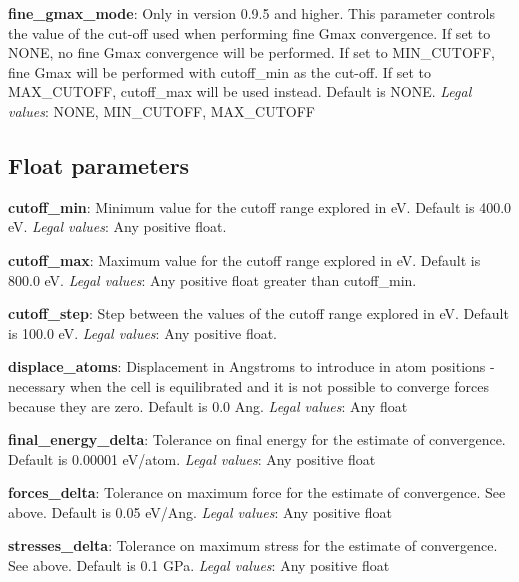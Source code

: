 \documentclass[10pt]{article}
\begin{document}
\textbf{fine\_gmax\_mode}: Only in version 0.9.5 and higher. This parameter controls the value of the cut-off used when performing
fine Gmax convergence. If set to NONE, no fine Gmax convergence will be performed. If set to MIN\_CUTOFF, fine Gmax will be performed
with cutoff\_min as the cut-off. If set to MAX\_CUTOFF, cutoff\_max will be used instead. Default is NONE.
\newline
\textit{Legal values}: NONE, MIN\_CUTOFF, MAX\_CUTOFF

\subsection{Float parameters}

\textbf{cutoff\_min}: Minimum value for the cutoff range explored in eV. Default 
is 400.0 eV.\newline
\textit{Legal values}: Any positive float.\newline

\textbf{cutoff\_max}: Maximum value for the cutoff range explored in eV. Default 
is 800.0 eV.\newline
\textit{Legal values}: Any positive float greater than cutoff\_min.\newline

\textbf{cutoff\_step}: Step between the values of the cutoff range explored in 
eV. Default is 100.0 eV.\newline
\textit{Legal values}: Any positive float.\newline

\textbf{displace\_atoms}: Displacement in Angstroms to introduce in atom 
positions - necessary when the cell is equilibrated and it is not possible to 
converge forces because they are zero. Default is 0.0 Ang.\newline
\textit{Legal values}: Any float\newline

\textbf{final\_energy\_delta}: Tolerance on final energy for the estimate of 
convergence. Default is 0.00001 eV/atom.\newline
\textit{Legal values}: Any positive float\newline

\textbf{forces\_delta}: Tolerance on maximum force for the estimate of 
convergence. See above. Default is 0.05 eV/Ang.\newline
\textit{Legal values}: Any positive float\newline

\textbf{stresses\_delta}: Tolerance on maximum stress for the estimate of 
convergence. See above. Default is 0.1 GPa.\newline
\textit{Legal values}: Any positive float\newline
\end{document}
